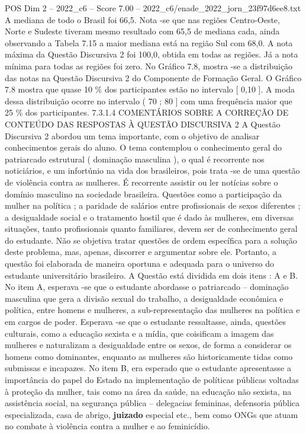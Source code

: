 \begin{textsample}{POS Dim 2 – 2022\_c6 – Score 7.00 – 2022\_c6/enade\_2022\_jorn\_23f97d6ee8.txt}
A mediana de todo o Brasil foi 66,5.
Nota -se que nas regiões Centro-Oeste, Norte e Sudeste tiveram mesmo resultado com 65,5 de mediana cada, ainda observando a Tabela 7.15 a maior mediana está na região Sul com 68,0.
A nota máxima da Questão Discursiva 2 foi 100,0, obtida em todas as regiões.
Já a nota mínima para todas as regiões foi zero.
No Gráfico 7.8, mostra -se a distribuição das notas na Questão Discursiva 2 do Componente de Formação Geral.
O Gráfico 7.8 mostra que quase 10 \% dos participantes estão no intervalo [ 0,10 ].
A moda dessa distribuição ocorre no intervalo ( 70 ; 80 ] com uma frequência maior que 25 \% dos participantes. 7.3.1.4 COMENTÁRIOS SOBRE A CORREÇÃO DE CONTEÚDO DAS RESPOSTAS À QUESTÃO DISCURSIVA 2 A Questão Discursiva 2 abordou um tema importante, com o objetivo de analisar conhecimentos gerais do aluno.
O tema contemplou o conhecimento geral do patriarcado estrutural ( dominação masculina ), o qual é recorrente nos noticiários, e um infortúnio na vida dos brasileiros, pois trata -se de uma questão de violência contra as mulheres.
É recorrente assistir ou ler notícias sobre o domínio masculino na sociedade brasileira.
Questões como a participação da mulher na política ; a paridade de salários entre profissionais de sexos diferentes ; a desigualdade social e o tratamento hostil que é dado às mulheres, em diversas situações, tanto profissionais quanto familiares, devem ser de conhecimento geral do estudante.
Não se objetiva tratar questões de ordem específica para a solução deste problema, mas, apenas, discorrer e argumentar sobre ele.
Portanto, a questão foi elaborada de maneira oportuna e adequada para o universo do estudante universitário brasileiro.
A Questão está dividida em dois itens : A e B.
No item A, esperava -se que o estudante abordasse o patriarcado – dominação masculina que gera a divisão sexual do trabalho, a desigualdade econômica e política, entre homens e mulheres, a sub-representação das mulheres na política e em cargos de poder.
Esperava -se que o estudante ressaltasse, ainda, questões culturais, como a educação sexista e a mídia, que coisificam a imagem das mulheres e naturalizam a desigualdade entre os sexos, de forma a considerar os homens como dominantes, enquanto as mulheres são historicamente tidas como submissas e incapazes.
No item B, era esperado que o estudante apresentasse a importância do papel do Estado na implementação de políticas públicas voltadas à proteção da mulher, tais como na área da saúde, na educação não sexista, na assistência social, na segurança pública – delegacias femininas, defensoria pública especializada, casa de abrigo, \textbf{juizado} especial etc., bem como ONGs que atuam no combate à violência contra a mulher e ao feminicídio.

\end{textsample}
